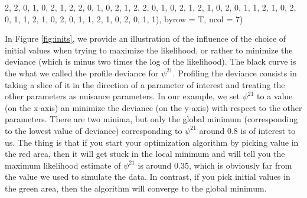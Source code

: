 \documentclass[
  12pt,
]{krantz}
\newenvironment{Shaded}{\begin{snugshade}}{\end{snugshade}}
\newcommand{\AttributeTok}[1]{\textcolor[rgb]{0.13,0.29,0.53}{#1}}
\newcommand{\DecValTok}[1]{\textcolor[rgb]{0.00,0.00,0.81}{#1}}
\newcommand{\NormalTok}[1]{#1}
\begin{document}
\begin{Shaded}
\begin{Highlighting}[]
                \DecValTok{2}\NormalTok{, }\DecValTok{2}\NormalTok{, }\DecValTok{0}\NormalTok{, }\DecValTok{1}\NormalTok{, }\DecValTok{0}\NormalTok{, }\DecValTok{2}\NormalTok{, }\DecValTok{1}\NormalTok{,}
                \DecValTok{2}\NormalTok{, }\DecValTok{2}\NormalTok{, }\DecValTok{0}\NormalTok{, }\DecValTok{1}\NormalTok{, }\DecValTok{0}\NormalTok{, }\DecValTok{2}\NormalTok{, }\DecValTok{1}\NormalTok{,}
                \DecValTok{2}\NormalTok{, }\DecValTok{2}\NormalTok{, }\DecValTok{0}\NormalTok{, }\DecValTok{1}\NormalTok{, }\DecValTok{0}\NormalTok{, }\DecValTok{2}\NormalTok{, }\DecValTok{1}\NormalTok{,}
                \DecValTok{2}\NormalTok{, }\DecValTok{1}\NormalTok{, }\DecValTok{0}\NormalTok{, }\DecValTok{2}\NormalTok{, }\DecValTok{0}\NormalTok{, }\DecValTok{1}\NormalTok{, }\DecValTok{1}\NormalTok{,}
                \DecValTok{2}\NormalTok{, }\DecValTok{1}\NormalTok{, }\DecValTok{0}\NormalTok{, }\DecValTok{2}\NormalTok{, }\DecValTok{0}\NormalTok{, }\DecValTok{1}\NormalTok{, }\DecValTok{1}\NormalTok{,}
                \DecValTok{2}\NormalTok{, }\DecValTok{1}\NormalTok{, }\DecValTok{0}\NormalTok{, }\DecValTok{2}\NormalTok{, }\DecValTok{0}\NormalTok{, }\DecValTok{1}\NormalTok{, }\DecValTok{1}\NormalTok{,}
                \DecValTok{2}\NormalTok{, }\DecValTok{1}\NormalTok{, }\DecValTok{0}\NormalTok{, }\DecValTok{2}\NormalTok{, }\DecValTok{0}\NormalTok{, }\DecValTok{1}\NormalTok{, }\DecValTok{1}\NormalTok{),}
              \AttributeTok{byrow =}\NormalTok{ T,}
              \AttributeTok{ncol =} \DecValTok{7}\NormalTok{)}
\end{Highlighting}
\end{Shaded}

In Figure \ref{fig:inits}, we provide an illustration of the influence of the choice of initial values when trying to maximize the likelihood, or rather to minimize the deviance (which is minus two times the log of the likelihood). The black curve is the what we called the profile deviance for \(\psi^{21}\). Profiling the deviance consists in taking a slice of it in the direction of a parameter of interest and treating the other parameters as nuisance parameters. In our example, we set \(\psi^{21}\) to a value (on the x-axis) an minimize the deviance (on the y-axis) with respect to the other parameters. There are two minima, but only the global minimum (corresponding to the lowest value of deviance) corresponding to \(\psi^{21}\) around 0.8 is of interest to us. The thing is that if you start your optimization algorithm by picking value in the red area, then it will get stuck in the local minimum and will tell you the maximum likelihood estimate of \(\psi^{21}\) is around 0.35, which is obviously far from the value we used to simulate the data. In contrast, if you pick initial values in the green area, then the algorithm will converge to the global minimum.
\end{document}
